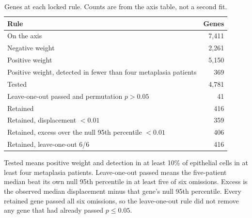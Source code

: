\documentclass[11pt,a4paper]{article}
\begin{document}
\begin{table}[htbp]
  \centering
  \caption{Genes at each locked rule. Counts are from the axis table, not a second fit.}
  \label{tab:filter}
  \small
  \begin{tabular}{p{}r}
    \toprule
    Rule & Genes \\
    \midrule
    On the axis & 7{,}411 \\
    Negative weight & 2{,}261 \\
    Positive weight & 5{,}150 \\
    Positive weight, detected in fewer than four metaplasia patients & 369 \\
    Tested & 4{,}781 \\
    Leave-one-out passed and permutation \(p>0.05\) & 41 \\
    Retained & 416 \\
    Retained, displacement \(<0.01\) & 359 \\
    Retained, excess over the null 95th percentile \(<0.01\) & 406 \\
    Retained, leave-one-out 6/6 & 416 \\
    \bottomrule
  \end{tabular}
  \par\vspace{0.35em}
  {\raggedright\footnotesize Tested means positive weight and detection in at least 10\% of epithelial cells in at least four metaplasia patients. Leave-one-out passed means the five-patient median beat its own null 95th percentile in at least five of six omissions. Excess is the observed median displacement minus that gene's null 95th percentile. Every retained gene passed all six omissions, so the leave-one-out rule did not remove any gene that had already passed \(p\le 0.05\).\par}
\end{table}
\end{document}
